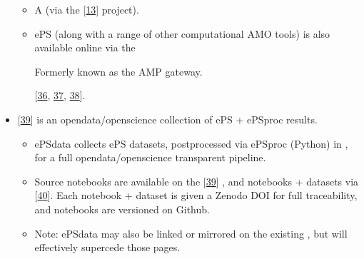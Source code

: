 \documentclass[letterpaper,table,10pt,english]{jupyterBook}
\begin{document}
\begin{itemize}
\begin{itemize}
\item {} 
\sphinxAtStartPar
A  (via the  {[}\hyperlink{cite.backmatter/bibliography:id671}{13}{]} project).

\item {} 
\sphinxAtStartPar
ePS (along with a range of other computational AMO tools) is also available online via the  %
\begin{footnote}[1]\sphinxAtStartFootnote
Formerly known as the AMP gateway.
%
\end{footnote} {[}\hyperlink{cite.backmatter/bibliography:id500}{36}, \hyperlink{cite.backmatter/bibliography:id852}{37}, \hyperlink{cite.backmatter/bibliography:id853}{38}{]}.

\end{itemize}

\item {} 
\sphinxAtStartPar
{} {[}\hyperlink{cite.backmatter/bibliography:id665}{39}{]} is an open\sphinxhyphen{}data/open\sphinxhyphen{}science collection of ePS + ePSproc results.
\begin{itemize}
\item {} 
\sphinxAtStartPar
ePSdata collects ePS datasets, post\sphinxhyphen{}processed via ePSproc (Python) in , for a full open\sphinxhyphen{}data/open\sphinxhyphen{}science transparent pipeline.

\end{itemize}
\begin{itemize}
\item {} 
\sphinxAtStartPar
Source notebooks are available on the  {[}\hyperlink{cite.backmatter/bibliography:id665}{39}{]} , and notebooks + datasets via  {[}\hyperlink{cite.backmatter/bibliography:id666}{40}{]}. Each notebook + dataset is given a Zenodo DOI for full traceability, and notebooks are versioned on Github.

\item {} 
\sphinxAtStartPar
Note: ePSdata may also be linked or mirrored on the existing , but will effectively supercede those pages.


\end{itemize}
\end{itemize}
\end{document}
